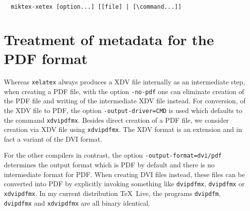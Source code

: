 \documentclass[a4paper, english]{article}%
\newcommand{\lualatex}{\texttt{lualatex}}
\newcommand{\xelatex}{\texttt{xelatex}}
\newcommand{\texlive}{\TeX~Live}
\newcommand{\miktex}{MiKTeX}
\begin{document}


  
  
  

\begin{verbatim}
  miktex-xetex [option...] [[file] | [\command...]]
\end{verbatim}







\section{Treatment of metadata for the PDF format}\label{sec:metaPDF}

Whereas \xelatex{} always produces a XDV file internally as an intermediate step, 
when creating a PDF file, with the option \texttt{-no-pdf} 
one can eliminate creation of the PDF file and writing of the intermediate XDV file instead. 
For conversion, of the XDV file to PDF, the option \texttt{-output-driver=CMD} 
is used which defaults to the command \texttt{xdvipdfmx}. 
Besides direct creation of a PDF file, 
we consider creation via XDV file using \texttt{xdvipdfmx}. 
The XDV format is an extension and in fact a variant of the DVI format. 

For the other compilers in contrast, the option \texttt{-output-format=dvi/pdf} 
determines the output format which is PDF by default 
and there is no intermediate format for PDF\@. 
When creating DVI files instead, these files can be converted into PDF 
by explicitly invoking something like 
\texttt{dvipdfmx}, \texttt{dvipdfmx} or \texttt{xdvipdfmx}. 
In my current distribution \texlive, 
the programs \texttt{dvipdfm}, \texttt{dvipdfmx} and \texttt{xdvipdfmx} 
are all binary identical. 
\end{document}
